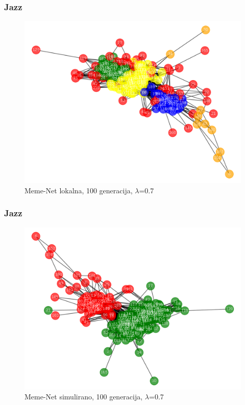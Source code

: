 \documentclass{beamer}
\begin{document}
\begin{frame}\frametitle{Jazz}
\begin{figure}[h!]
\begin{center}
\includegraphics[scale=0.4]{Jazz_MA_local_100g_0.7density.png}
\end{center}
\caption{Meme-Net lokalna, 100 generacija, $\lambda$=0.7}
\label{fig:Jazz_2}
\end{figure}
\end{frame}

\begin{frame}\frametitle{Jazz}
\begin{figure}[h!]
\begin{center}
\includegraphics[scale=0.4]{Jazz_MA_SAnneal_100g_1000_0.7density.png}
\end{center}
\caption{Meme-Net simulirano, 100 generacija, $\lambda$=0.7}
\label{fig:Jazz_3}
\end{figure}
\end{frame}
\end{document}
